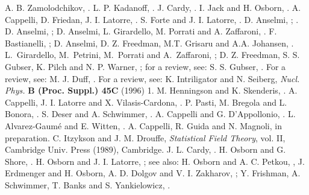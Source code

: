 \documentclass[proceedings]{JHEP}
\begin{document}
\begin{thebibliography}{99} 
   A. B. Zamolodchikov, .
  L. P. Kadanoff, .  
 J. Cardy, . 
    I. Jack and H. Osborn, .
   A. Cappelli, D. Friedan, J. I. Latorre, . 
    S. Forte and J. I. Latorre,  .  
   D. Anselmi, ; . 
 D. Anselmi, ;
              D. Anselmi, L. Girardello, M. Porrati and A. Zaffaroni, 
               .
  F. Bastianelli, ;
                D. Anselmi, D. Z. Freedman, M.T. Grisaru and A.A. Johansen,  
                . 
  L.~Girardello, M.~Petrini, M.~Porrati and A.~Zaffaroni, 
                ; D. Z. Freedman, S. S. Gubser, 
                K. Pilch and N. P. Warner, ; for a review, see:
                S. S. Gubser, . 
  For a review, see: M. J. Duff, . 
 For a review, see: K. Intriligator and N. Seiberg, 
                 {\it Nucl. Phys.} {\bf B (Proc. Suppl.) 45C} (1996) 1.
  M. Henningson and K. Skenderis, .
 A. Cappelli, J. I. Latorre and X. Vilasis-Cardona,
              .
  P. Pasti, M. Bregola and L. Bonora, .
    S. Deser and A. Schwimmer, .  
    A. Cappelli and G. D'Appollonio, .
 L. Alvarez-Gaum\'e and E. Witten, . 
 A. Cappelli, R. Guida and N. Magnoli, in preparation.
   C. Itzykson and J. M. Drouffe, {\it Statistical Field Theory},
               vol. II, Cambridge Univ. Press (1989), Cambridge.
 J. L. Cardy, .
  H. Osborn and G. Shore, .
  H. Osborn and J. I. Latorre, ;
              see also: H. Osborn and A. C. Petkou, ,
              J. Erdmenger and H. Osborn, 
 A. D. Dolgov and V. I. Zakharov, ;
              Y. Frishman, A. Schwimmer, T. Banks and S. Yankielowicz, 
              . 
\end{thebibliography} 
\end{document}
